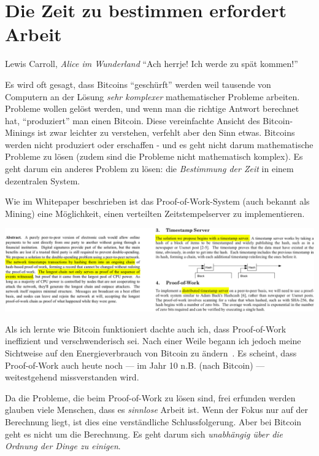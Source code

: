 \chapter{Die Zeit zu bestimmen erfordert Arbeit}
\label{les:17}

\begin{chapquote}{Lewis Carroll, \textit{Alice im Wunderland}}
\enquote{Ach herrje! Ich werde zu spät kommen!}
\end{chapquote}

Es wird oft gesagt, dass Bitcoins \enquote{geschürft} werden weil tausende von
Computern an der Lösung \textit{sehr komplexer} mathematischer Probleme
arbeiten. Probleme wollen gelöst werden, und wenn man die richtige Antwort
berechnet hat, \enquote{produziert} man einen Bitcoin. Diese vereinfachte
Ansicht des Bitcoin-Minings ist zwar leichter zu verstehen, verfehlt aber den
Sinn etwas. Bitcoins werden nicht produziert oder erschaffen - und es geht nicht
darum mathematische Probleme zu lösen (zudem sind die Probleme nicht
mathematisch komplex). Es geht darum ein anderes Problem zu lösen: die
\textit{Bestimmung der Zeit} in einem dezentralen System.

Wie im Whitepaper beschrieben ist das Proof-of-Work-System (auch bekannt als
Mining) eine Möglichkeit, einen verteilten Zeitstempelserver zu implementieren.

\begin{center}
  \includegraphics[width=\textwidth]{assets/images/bitcoin-whitepaper-timestamp-wide.png}
  \label{fig:bitcoin-whitepaper-timestamp-wide}
\end{center}

Als ich lernte wie Bitcoin funktioniert dachte auch ich, dass Proof-of-Work
ineffizient und verschwenderisch sei. Nach einer Weile begann ich jedoch meine
Sichtweise auf den Energieverbrauch von Bitcoin zu ändern~\cite{gigi:energy}. Es
scheint, dass Proof-of-Work auch heute noch --- im Jahr 10 n.B. (nach Bitcoin)
--- weitestgehend missverstanden wird.

Da die Probleme, die beim Proof-of-Work zu lösen sind, frei erfunden werden
glauben viele Menschen, dass es \textit{sinnlose} Arbeit ist. Wenn der Fokus nur
auf der Berechnung liegt, ist dies eine verständliche Schlussfolgerung. Aber bei
Bitcoin geht es nicht um die Berechnung. Es geht darum sich \textit{unabhängig
über die Ordnung der Dinge zu einigen}.

